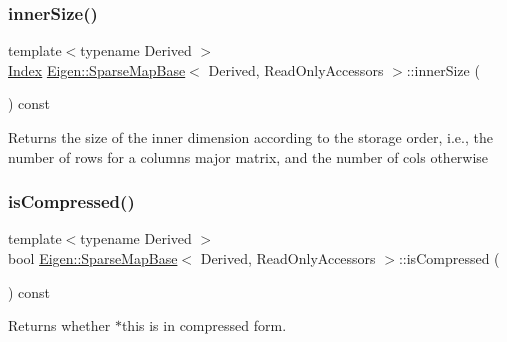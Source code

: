 \subsubsection{\texorpdfstring{innerSize()}{innerSize()}}
{\footnotesize\ttfamily template$<$typename Derived $>$ \\
\mbox{\hyperlink{struct_eigen_1_1_eigen_base_a554f30542cc2316add4b1ea0a492ff02}{Index}} \mbox{\hyperlink{class_eigen_1_1_sparse_map_base}{Eigen\+::\+Sparse\+Map\+Base}}$<$ Derived, Read\+Only\+Accessors $>$\+::inner\+Size (\begin{DoxyParamCaption}{ }\end{DoxyParamCaption}) const\hspace{0.3cm}{\ttfamily [inline]}}





\begin{DoxyReturn}{Returns}
the size of the inner dimension according to the storage order, i.\+e., the number of rows for a columns major matrix, and the number of cols otherwise 
\end{DoxyReturn}
\mbox{\label{class_eigen_1_1_sparse_map_base_3_01_derived_00_01_read_only_accessors_01_4_aafab4afa7ab2ff89eff049d4c71e2ce4}} 
\subsubsection{\texorpdfstring{isCompressed()}{isCompressed()}}
{\footnotesize\ttfamily template$<$typename Derived $>$ \\
bool \mbox{\hyperlink{class_eigen_1_1_sparse_map_base}{Eigen\+::\+Sparse\+Map\+Base}}$<$ Derived, Read\+Only\+Accessors $>$\+::is\+Compressed (\begin{DoxyParamCaption}{ }\end{DoxyParamCaption}) const\hspace{0.3cm}{\ttfamily [inline]}}





\begin{DoxyReturn}{Returns}
whether {\ttfamily $\ast$this} is in compressed form. 
\end{DoxyReturn}
\mbox{\label{class_eigen_1_1_sparse_map_base_3_01_derived_00_01_read_only_accessors_01_4_a753e975b7b3643d821dc061141786870}} 
